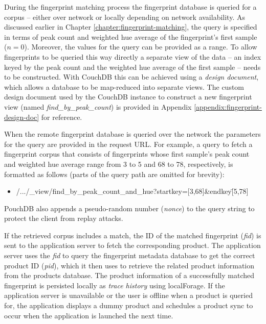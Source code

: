 \documentclass[thesis.tex]{subfiles}
\begin{document}
During the fingerprint matching process the fingerprint database is queried for a corpus -- either over network or locally depending on network availability. As discussed earlier in Chapter \ref{chapter:fingerprint-matching}, the query is specified in terms of peak count and weighted hue average of the fingerprint's first sample ($n=0$). Moreover, the values for the query can be provided as a range. To allow fingerprints to be queried this way directly a separate view of the data -- an index keyed by the peak count and the weighted hue average of the first sample -- needs to be constructed. With CouchDB this can be achieved using a \emph{design document}, which allows a database to be map-reduced into separate views. The custom design document used by the CouchDB instance to construct a new fingerprint view (named \emph{find\_by\_peak\_count}) is provided in Appendix \ref{appendix:fingerprint-design-doc} for reference.

When the remote fingerprint database is queried over the network the parameters for the query are provided in the request URL. For example, a query to fetch a fingerprint corpus that consists of fingerprints whose first sample's peak count and weighted hue average range from 3 to 5 and 68 to 78, respectively, is formatted as follows (parts of the query path are omitted for brevity):

\begin{itemize}[label=]
	\item /.../\_view/find\_by\_peak\_count\_and\_hue?startkey=[3,68]\&endkey\=[5,78]
\end{itemize}

\noindent PouchDB also appends a pseudo-random number (\emph{nonce}) to the query string to protect the client from replay attacks.

If the retrieved corpus includes a match, the ID of the matched fingerprint (\emph{fid}) is sent to the application server to fetch the corresponding product. The application server uses the \emph{fid} to query the fingerprint metadata database to get the correct product ID (\emph{pid}), which it then uses to retrieve the related product information from the products database. The product information of a successfully matched fingerprint is persisted locally as \emph{trace history} using localForage. If the application server is unavailable or the user is offline when a product is queried for, the application displays a dummy product and schedules a product sync to occur when the application is launched the next time.
\end{document}

